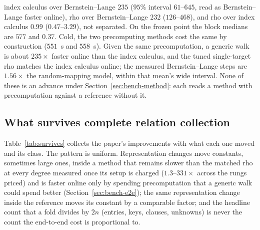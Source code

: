 index calculus over Bernstein--Lange $235$ ($95\%$ interval $61$--$645$,
read as Bernstein--Lange faster online), rho over Bernstein--Lange $232$
($126$--$468$), and rho over index calculus $0.99$ ($0.47$--$3.29$), not
separated. On the frozen point the block medians are $577$ and $0.37$.
Cold, the two precomputing methods cost the same by construction
($551$~s and $558$~s). Given the same precomputation, a generic walk is
about $235\times$ faster online than the index calculus, and the tuned
single-target rho matches the index calculus online; the measured
Bernstein--Lange steps are $1.56\times$ the random-mapping model, within
that mean's wide interval.
None of these is an advance under Section~\ref{sec:bench-method}: each
reads a method with precomputation against a reference without it.

\subsection{What survives complete relation collection}
\label{sec:survives}

Table~\ref{tab:survives} collects the paper's improvements with what
each one moved and its class. The pattern is uniform. Representation
changes move constants, sometimes large ones, inside a method that
remains slower than the matched rho at every degree measured once its
setup is charged ($1.3$--$331\times$ across the rungs priced) and is
faster online only by spending precomputation that a generic walk
could spend better (Section~\ref{sec:bench-e2e}); the same representation change inside the reference moves
its constant by a comparable factor; and the headline count that a
fold divides by $2n$ (entries, keys, clauses, unknowns) is never the
count the end-to-end cost is proportional to.

